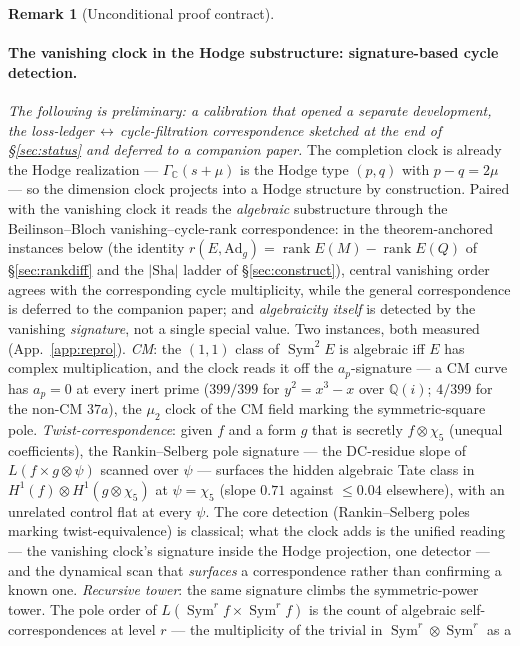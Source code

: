 \documentclass[11pt]{article}
\theoremstyle{definition}
\newtheorem{remark}[theorem]{Remark}
\newcommand{\Sym}{\operatorname{Sym}}
\newcommand{\Sha}{\mathrm{Sha}}
\begin{document}
\begin{remark}[Unconditional proof contract]
\begin{enumerate}
\paragraph{The vanishing clock in the Hodge substructure: signature-based cycle detection.}
\emph{The following is preliminary: a calibration that opened a separate development, the
loss-ledger$\,\leftrightarrow\,$cycle-filtration correspondence sketched at the end of \S\ref{sec:status}
and deferred to a companion paper.} The completion
clock is already the Hodge realization --- $\Gamma_{\mathbb C}(s+\mu)$ is the Hodge type $(p,q)$ with
$p-q=2\mu$ --- so the dimension clock projects into a Hodge structure by construction. Paired with the
vanishing clock it reads the \emph{algebraic} substructure through the Beilinson--Bloch
vanishing--cycle-rank correspondence: in the theorem-anchored instances below (the identity
$r(E,\mathrm{Ad}_g)=\operatorname{rank}E(M)-\operatorname{rank}E(Q)$ of \S\ref{sec:rankdiff} and the
$|\Sha|$ ladder of \S\ref{sec:construct}), central vanishing order agrees with the corresponding cycle
multiplicity, while the general correspondence is deferred to the companion paper; and
\emph{algebraicity itself} is detected by the vanishing \emph{signature}, not a single special value. Two
instances, both measured (App.~\ref{app:repro}). \emph{CM}: the $(1,1)$ class of $\Sym^2 E$ is algebraic
iff $E$ has complex multiplication, and the clock reads it off the $a_p$-signature --- a CM curve has
$a_p=0$ at every inert prime ($399/399$ for $y^2=x^3-x$ over $\mathbb Q(i)$; $4/399$ for the non-CM $37a$),
the $\mu_2$ clock of the CM field marking the symmetric-square pole. \emph{Twist-correspondence}: given $f$
and a form $g$ that is secretly $f\otimes\chi_5$ (unequal coefficients), the Rankin--Selberg pole signature
--- the DC-residue slope of $L(f\times g\otimes\psi)$ scanned over $\psi$ --- surfaces the hidden algebraic
Tate class in $H^1(f)\otimes H^1(g\otimes\chi_5)$ at $\psi=\chi_5$ (slope $0.71$ against $\le0.04$
elsewhere), with an unrelated control flat at every $\psi$. The core detection (Rankin--Selberg poles
marking twist-equivalence) is classical; what the clock adds is the unified reading --- the vanishing
clock's signature inside the Hodge projection, one detector --- and the dynamical scan that \emph{surfaces}
a correspondence rather than confirming a known one. \emph{Recursive tower}: the same signature climbs the
symmetric-power tower. The pole order of $L(\Sym^r f\times\Sym^r f)$ is the count of algebraic
self-correspondences at level $r$ --- the multiplicity of the trivial in $\Sym^r\otimes\Sym^r$ as a

\end{enumerate}
\end{remark}
\end{document}
